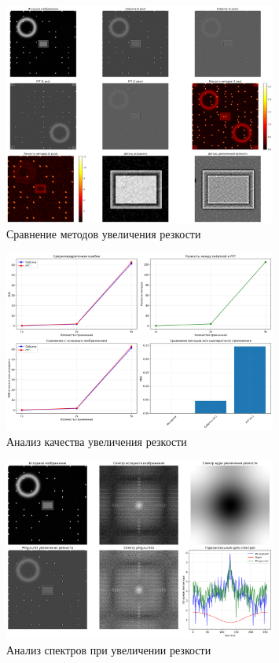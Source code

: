 \begin{figure}[H]
    \centering
    \includegraphics[width=0.8\textwidth]{images/task3/method_comparison.png}
    \caption{Сравнение методов увеличения резкости}
    \label{fig:method_comparison_sharp}
\end{figure}

\begin{figure}[H]
    \centering
    \includegraphics[width=0.8\textwidth]{images/task3/quality_analysis.png}
    \caption{Анализ качества увеличения резкости}
    \label{fig:quality_analysis_sharp}
\end{figure}

\begin{figure}[H]
    \centering
    \includegraphics[width=0.8\textwidth]{images/task3/spectrum_analysis.png}
    \caption{Анализ спектров при увеличении резкости}
    \label{fig:spectrum_analysis_sharp}
\end{figure}

